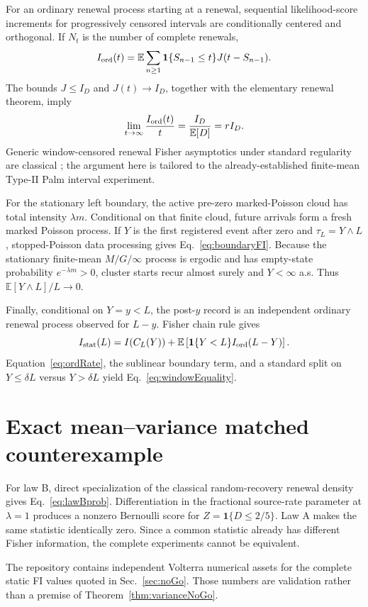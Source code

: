 \documentclass[aps,prapplied,preprint,nofootinbib]{revtex4-2}
\newcommand{\E}{\mathbb E}
\begin{document}
For an ordinary renewal process starting at a renewal, sequential likelihood-score increments for progressively censored intervals are conditionally centered and orthogonal. If $N_t$ is the number of complete renewals,
\begin{equation}
I_{\rm ord}(t)
=\E\sum_{n\ge1}
\mathbf 1\{S_{n-1}\le t\}
J(t-S_{n-1}).
\end{equation}
The bounds $J\le I_D$ and $J(t)\to I_D$, together with the elementary renewal theorem, imply
\begin{equation}
\lim_{t\to\infty}\frac{I_{\rm ord}(t)}{t}
=\frac{I_D}{\E[D]}
=rI_D.
\label{eq:ordRate}
\end{equation}
Generic window-censored renewal Fisher asymptotics under standard regularity are classical \cite{ZhaoNagaraja2011}; the argument here is tailored to the already-established finite-mean Type-II Palm interval experiment.

For the stationary left boundary, the active pre-zero marked-Poisson cloud has total intensity $\lambda m$. Conditional on that finite cloud, future arrivals form a fresh marked Poisson process. If $Y$ is the first registered event after zero and $\tau_L=Y\wedge L$, stopped-Poisson data processing gives Eq.~\eqref{eq:boundaryFI}. Because the stationary finite-mean $M/G/\infty$ process is ergodic and has empty-state probability $e^{-\lambda m}>0$, cluster starts recur almost surely and $Y<\infty$ a.s. Thus $\E[Y\wedge L]/L\to0$.

Finally, conditional on $Y=y<L$, the post-$y$ record is an independent ordinary renewal process observed for $L-y$. Fisher chain rule gives
\begin{equation}
I_{\rm stat}(L)
=I(C_L(Y))
+\E\left[\mathbf 1\{Y<L\}I_{\rm ord}(L-Y)\right].
\end{equation}
Equation~\eqref{eq:ordRate}, the sublinear boundary term, and a standard split on $Y\le\delta L$ versus $Y>\delta L$ yield Eq.~\eqref{eq:windowEquality}.

\section{Exact mean--variance matched counterexample}
\label{app:variance}

For law B, direct specialization of the classical random-recovery renewal density gives Eq.~\eqref{eq:lawBprob}. Differentiation in the fractional source-rate parameter at $\lambda=1$ produces a nonzero Bernoulli score for $Z=\mathbf1\{D\le2/5\}$. Law A makes the same statistic identically zero. Since a common statistic already has different Fisher information, the complete experiments cannot be equivalent.

The repository contains independent Volterra numerical assets for the complete static FI values quoted in Sec.~\ref{sec:noGo}. Those numbers are validation rather than a premise of Theorem~\ref{thm:varianceNoGo}.



\end{document}
